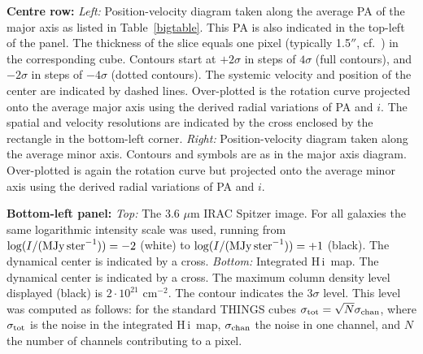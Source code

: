 \documentclass[usenatbib,usegraphicx,apjfonts,floatfix]{emulateapj}
\newcommand{\HI}{H\,{\sc i}}
\begin{document}
{\bf Centre row:} \emph{Left:} Position-velocity diagram taken along
the average PA of the major axis as listed in Table~\ref{bigtable}.
This PA is also indicated in the top-left of the panel.  The thickness
of the slice equals one pixel (typically 1.5$''$, cf.\
\citealt{THINGS1}) in the corresponding cube. Contours start at
$+2\sigma$ in steps of $4\sigma$ (full contours), and $-2\sigma$ in
steps of $-4\sigma$ (dotted contours).  The systemic velocity and
position of the center are indicated by dashed lines. Over-plotted is
the rotation curve projected onto the average major axis using the
derived radial variations of PA and $i$.  The spatial and velocity
resolutions are indicated by the cross enclosed by the rectangle in
the bottom-left corner. \emph{Right:} Position-velocity diagram taken
along the average minor axis. Contours and symbols are as in the major
axis diagram. Over-plotted is again the rotation curve but projected
onto the average minor axis using the derived radial variations of PA
and $i$.

{\bf Bottom-left panel:} \emph{Top:} The 3.6 $\mu$m IRAC Spitzer
image.  For all galaxies the same logarithmic intensity scale was
used, running from $\log (I/({\rm{MJy\, ster}}^{-1})) = -2$ (white) to
$\log (I/({\rm{MJy\, ster}}^{-1})) = +1$ (black). The dynamical center
is indicated by a cross. \emph{Bottom:} Integrated \HI\ map. The
dynamical center is indicated by a cross. The maximum column density
level displayed (black) is $2 \cdot 10^{21}$ cm$^{-2}$. The contour
indicates the  $3\sigma$ level. This level was computed as
follows: for the standard THINGS cubes $\sigma_{\rm tot} =
\sqrt{N}\sigma_{\rm chan}$, where $\sigma_{\rm tot}$ is the noise in the
integrated \HI\ map, $\sigma_{\rm chan}$ the noise in one channel, and
$N$ the number of channels contributing to a pixel. 
\end{document}
